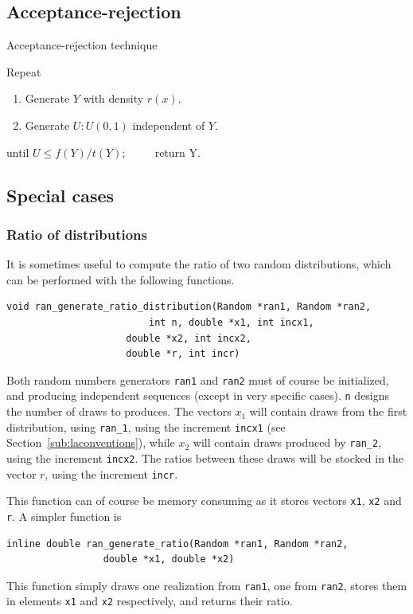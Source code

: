 
\subsection{Acceptance-rejection}

\begin{algo}{Acceptance-rejection technique}

\mbox{}

\noindent
Repeat
\begin{enumerate}
\item
Generate $Y$ with density $r(x)$.
\item
Generate $U: U (0, 1)$ independent of $Y$.
\end{enumerate}
until $U \leq f (Y )/t(Y )$; $\qquad$ return Y.
\end{algo}

\subsection{Special cases}

\subsubsection{Ratio of distributions}

It is sometimes useful to compute the ratio of two random
distributions, which can be performed with the following functions.
\begin{verbatim}
void ran_generate_ratio_distribution(Random *ran1, Random *ran2,
			             int n, double *x1, int incx1,
				     double *x2, int incx2,
				     double *r, int incr)
\end{verbatim}
Both random numbers generators \verb|ran1| and \verb|ran2| must of
course be initialized, and producing independent sequences (except in
very specific cases). \verb|n| designs the number of draws to
produces.
The vectors $x_1$ will contain draws from the first distribution,
using \verb|ran_1|, using the increment \verb|incx1| (see
Section~\ref{sub:laconventions}), while $x_2$ will contain draws
produced by \verb|ran_2|, using the increment \verb|incx2|.
The ratios between these draws will be stocked in the vector $r$,
using the increment \verb|incr|.

This function can of course be memory consuming as it stores vectors
\verb|x1|,  \verb|x2| and  \verb|r|. A simpler function is
\begin{verbatim}
inline double ran_generate_ratio(Random *ran1, Random *ran2,
				 double *x1, double *x2)
\end{verbatim}
This function simply draws one realization from \verb|ran1|, one from
\verb|ran2|, stores them in elements \verb|x1| and \verb|x2|
respectively, and returns their ratio.

